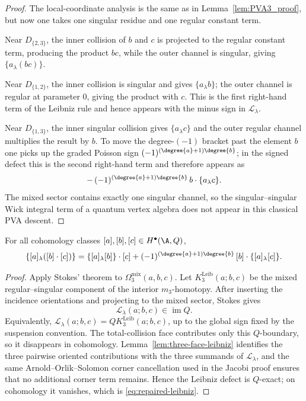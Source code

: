 \begin{proof}
The local-coordinate analysis is the same as in Lemma~\ref{lem:PVA3_proof}, but now
one takes one singular residue and one regular constant term.

Near $D_{\{2,3\}}$, the inner collision of $b$ and $c$ is projected to the regular
constant term, producing the product $bc$, while the outer channel is singular, giving
$\{a_\lambda(bc)\}$.

Near $D_{\{1,2\}}$, the inner collision is singular and gives $\{a_\lambda b\}$; the
outer channel is regular at parameter $0$, giving the product with
$c$. This is the first right-hand term of the Leibniz rule and hence
appears with the minus sign in \(\mathcal L_\lambda\).

Near $D_{\{1,3\}}$, the inner singular collision gives $\{a_\lambda c\}$ and the
outer regular channel multiplies the result by $b$. To move the degree-$(-1)$ bracket
past the element $b$ one picks up the graded Poisson sign
$(-1)^{(\degree{a}+1)\degree{b}}$; in the signed defect this is the
second right-hand term and therefore appears as
\[
-\,(-1)^{(\degree{a}+1)\degree{b}}\,b\cdot\{a_\lambda c\}.
\]
The mixed sector contains exactly one singular channel, so the
singular--singular Wick integral term of a quantum vertex algebra does
not appear in this classical PVA descent.
\end{proof}

\begin{proposition}
\label{prop:PVA3_proof}
\label{prop:Leibniz}
For all cohomology classes $[a],[b],[c]\in H^\bullet(\A,Q)$,
\begin{equation}
\label{eq:repaired-leibniz}
\{[a]_\lambda([b]\cdot[c])\}
=
\{[a]_\lambda[b]\}\cdot[c]
+
(-1)^{(\degree{a}+1)\degree{b}}\,[b]\cdot\{[a]_\lambda[c]\}.
\end{equation}
\end{proposition}

\begin{proof}
Apply Stokes' theorem to $\Omega_3^{\mathrm{mix}}(a,b,c)$. Let
\(K_3^{\mathrm{Leib}}(a;b,c)\) be the mixed regular--singular
component of the interior \(m_3\)-homotopy. After inserting the
incidence orientations and projecting to the mixed sector, Stokes gives
\[
\mathcal L_\lambda(a;b,c)\in \operatorname{im}Q.
\]
Equivalently,
\(\mathcal L_\lambda(a;b,c)=QK_3^{\mathrm{Leib}}(a;b,c)\), up to the
global sign fixed by the suspension convention. The total-collision
face contributes only this \(Q\)-boundary, so it disappears in
cohomology. Lemma~\ref{lem:three-face-leibniz} identifies the three
pairwise oriented contributions with the three summands of
\(\mathcal L_\lambda\), and the same Arnold--Orlik--Solomon corner
cancellation used in the Jacobi proof ensures that no additional
corner term remains. Hence the Leibniz defect is \(Q\)-exact; on
cohomology it vanishes, which is \eqref{eq:repaired-leibniz}.
\end{proof}

